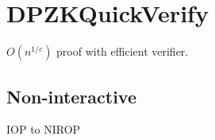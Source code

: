 \section{DPZKQuickVerify} \label{sec:quickverify}

$O(n^{1/c})$ proof with efficient verifier.

\subsection{Non-interactive}
IOP to NIROP